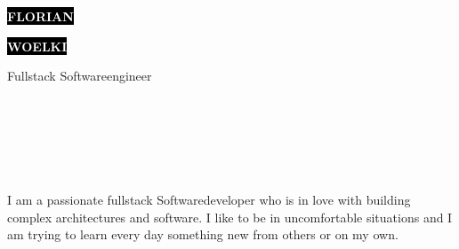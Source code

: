 \documentclass[9pt]{cvstyle}
\begin{document}
\begin{minipage}[t]{0.45\textwidth} 
	\vspace{-\baselineskip}
	
	\colorbox{black}{{\HUGE\textcolor{white}{\textbf{\MakeUppercase{Florian}}}}}
	
	\colorbox{black}{{\HUGE\textcolor{white}{\textbf{\MakeUppercase{Woelki}}}}}
	
	\vspace{6pt}
	
	{\huge Fullstack Softwareengineer}
\end{minipage}
\begin{minipage}[t]{0.275\textwidth}
	\vspace{-\baselineskip}
	
	\\
	\\	
\end{minipage}
\begin{minipage}[t]{0.275\textwidth}
	\vspace{-\baselineskip}
	
	\\
	\\
\end{minipage}

\vspace{0.5cm}


\begin{minipage}[t]{0.4\textwidth} 
	\vspace{-\baselineskip} 
	
	I am a passionate fullstack Softwaredeveloper who is in love with building complex
	architectures and software. I like to be in uncomfortable situations and I am trying
	to learn every day something new from others or on my own.\\ 
\end{minipage}
\hfill 
\begin{minipage}[t]{0.5\textwidth} 
	\vspace{-\baselineskip} 
	\begin{barchart}{5.5}
	\end{barchart}
\end{minipage}
\end{document}
